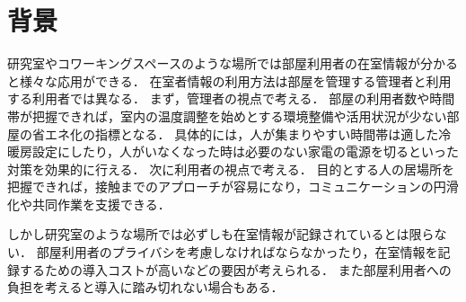 





\section{背景}\label{1.1}
研究室やコワーキングスペースのような場所では部屋利用者の在室情報が分かると様々な応用ができる．
在室者情報の利用方法は部屋を管理する管理者と利用する利用者では異なる．
まず，管理者の視点で考える．
部屋の利用者数や時間帯が把握できれば，室内の温度調整を始めとする環境整備や活用状況が少ない部屋の省エネ化の指標となる．
具体的には，人が集まりやすい時間帯は適した冷暖房設定にしたり，人がいなくなった時は必要のない家電の電源を切るといった対策を効果的に行える．
次に利用者の視点で考える．
目的とする人の居場所を把握できれば，接触までのアプローチが容易になり，コミュニケーションの円滑化や共同作業を支援できる．

しかし研究室のような場所では必ずしも在室情報が記録されているとは限らない．
部屋利用者のプライバシを考慮しなければならなかったり\cite{privacy}，在室情報を記録するための導入コストが高いなど\cite{smartphone}の要因が考えられる．
また部屋利用者への負担を考えると導入に踏み切れない場合もある．




